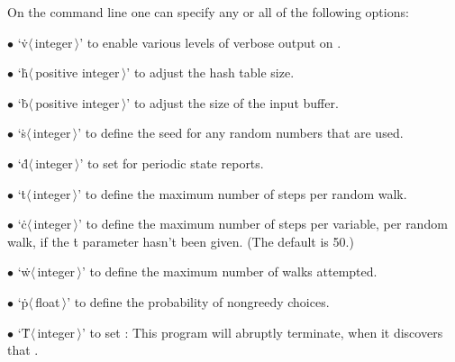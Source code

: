 On the command line one can specify any or all of the
following options:
\smallskip
\item{$\bullet$}
`\.v$\langle\,$integer$\,\rangle$' to enable various levels of verbose
output on .
\item{$\bullet$}
`\.h$\langle\,$positive integer$\,\rangle$' to adjust the hash table size.
\item{$\bullet$}
`\.b$\langle\,$positive integer$\,\rangle$' to adjust the size of the input
buffer.
\item{$\bullet$}
`\.s$\langle\,$integer$\,\rangle$' to define the seed for any random numbers
that are used.
\item{$\bullet$}
`\.d$\langle\,$integer$\,\rangle$' to set  for periodic state
reports.
\item{$\bullet$}
`\.t$\langle\,$integer$\,\rangle$' to define the maximum number of steps per
random walk.
\item{$\bullet$}
`\.c$\langle\,$integer$\,\rangle$' to define the maximum number of steps per
variable, per random walk, if the \.t parameter hasn't been given.
(The default is 50.)
\item{$\bullet$}
`\.w$\langle\,$integer$\,\rangle$' to define the maximum number of walks
attempted.
\item{$\bullet$}
`\.p$\langle\,$float$\,\rangle$' to define the probability  of
nongreedy choices.
\item{$\bullet$}
`\.T$\langle\,$integer$\,\rangle$' to set : This program will
abruptly terminate, when it discovers that .

